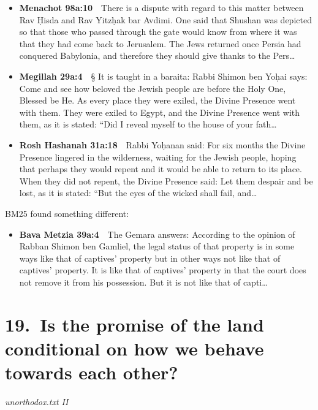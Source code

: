 \documentclass[11pt,a4paper]{article}
\begin{document}
\begin{itemize}[leftmargin=1.2em,itemsep=3pt]
\item {\color{ref}\textbf{Menachot 98a:10}}\ \ There is a dispute with regard to this matter between Rav Ḥisda and Rav Yitzḥak bar Avdimi. One said that Shushan was depicted so that those who passed through the gate would know from where it was that they had come back to Jerusalem. The Jews returned once Persia had conquered Babylonia, and therefore they should give thanks to the Pers\ldots
\item {\color{ref}\textbf{Megillah 29a:4}}\ \ § It is taught in a baraita: Rabbi Shimon ben Yoḥai says: Come and see how beloved the Jewish people are before the Holy One, Blessed be He. As every place they were exiled, the Divine Presence went with them. They were exiled to Egypt, and the Divine Presence went with them, as it is stated: “Did I reveal myself to the house of your fath\ldots
\item {\color{ref}\textbf{Rosh Hashanah 31a:18}}\ \ Rabbi Yoḥanan said: For six months the Divine Presence lingered in the wilderness, waiting for the Jewish people, hoping that perhaps they would repent and it would be able to return to its place. When they did not repent, the Divine Presence said: Let them despair and be lost, as it is stated: “But the eyes of the wicked shall fail, and\ldots
\end{itemize}
{\color{quiet}\small BM25 found something different:}
\begin{itemize}[leftmargin=1.2em]
\item {\color{ref}\textbf{Bava Metzia 39a:4}}\ \ The Gemara answers: According to the opinion of Rabban Shimon ben Gamliel, the legal status of that property is in some ways like that of captives’ property but in other ways not like that of captives’ property. It is like that of captives’ property in that the court does not remove it from his possession. But it is not like that of capti\ldots
\end{itemize}

\section*{19.\ Is the promise of the land conditional on how we behave towards each other?}
{\color{quiet}\small\textit{unorthodox.txt II}}
\end{document}
